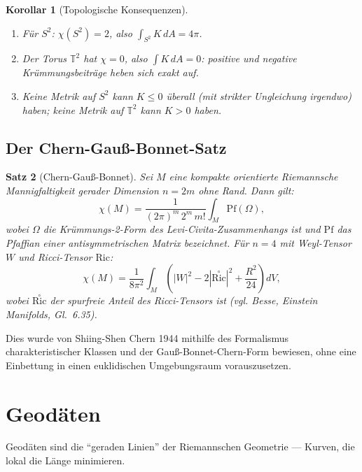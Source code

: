 \documentclass[12pt,a4paper]{amsart}
\newtheorem{theorem}{Satz}[section]
\newtheorem{korollar}[theorem]{Korollar}
\theoremstyle{definition}
\begin{document}
\begin{korollar}[Topologische Konsequenzen]
\begin{enumerate}[label=(\roman*)]
  \item Für $S^2$: $\chi(S^2) = 2$, also $\int_{S^2} K\,dA = 4\pi$.
  \item Der Torus $\mathbb{T}^2$ hat $\chi = 0$, also $\int K\,dA = 0$:
        positive und negative Krümmungsbeiträge heben sich exakt auf.
  \item Keine Metrik auf $S^2$ kann $K \leq 0$ überall (mit strikter Ungleichung
        irgendwo) haben; keine Metrik auf $\mathbb{T}^2$ kann $K > 0$ haben.
\end{enumerate}
\end{korollar}

\subsection{Der Chern-Gauß-Bonnet-Satz}

\begin{theorem}[Chern-Gauß-Bonnet]
\label{thm:chern-gauss-bonnet}
Sei $M$ eine kompakte orientierte Riemannsche Mannigfaltigkeit gerader Dimension
$n = 2m$ ohne Rand. Dann gilt:
\[
  \chi(M) = \frac{1}{(2\pi)^m \, 2^m \, m!} \int_M \mathrm{Pf}(\Omega),
\]
wobei $\Omega$ die Krümmungs-2-Form des Levi-Civita-Zusammenhangs ist und
$\mathrm{Pf}$ das Pfaffian einer antisymmetrischen Matrix bezeichnet.
Für $n=4$ mit Weyl-Tensor $W$ und Ricci-Tensor $\mathrm{Ric}$:
\[
  \chi(M) = \frac{1}{8\pi^2}\int_M
  \left(|W|^2 - 2|\overset{\circ}{\mathrm{Ric}}|^2
  + \frac{R^2}{24}\right) dV,
\]
wobei $\overset{\circ}{\mathrm{Ric}}$ der spurfreie Anteil des Ricci-Tensors ist
(vgl. Besse, \emph{Einstein Manifolds}, Gl.~6.35).
\end{theorem}

Dies wurde von Shiing-Shen Chern 1944 mithilfe des Formalismus charakteristischer
Klassen und der Gauß-Bonnet-Chern-Form bewiesen, ohne eine Einbettung in einen
euklidischen Umgebungsraum vorauszusetzen.

\section{Geodäten}
\label{sec:geodaeten}

Geodäten sind die ``geraden Linien'' der Riemannschen Geometrie ---
Kurven, die lokal die Länge minimieren.
\end{document}
